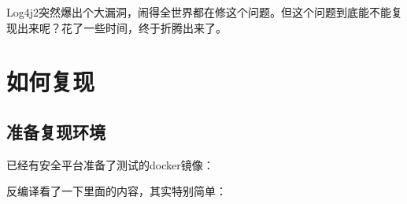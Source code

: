 \documentclass[12pt]{article}
\begin{document}
\makeblogtitle

Log4j2突然爆出个大漏洞，闹得全世界都在修这个问题。但这个问题到底能不能复现出来呢？花了一些时间，终于折腾出来了。

\section{如何复现}\label{ux5982ux4f55ux590dux73b0}

\subsection{准备复现环境}\label{ux51c6ux5907ux590dux73b0ux73afux5883}

已经有安全平台准备了测试的docker镜像：

\begin{Shaded}
\begin{Highlighting}[]
 
\end{Highlighting}
\end{Shaded}

反编译看了一下里面的内容，其实特别简单：
\end{document}

